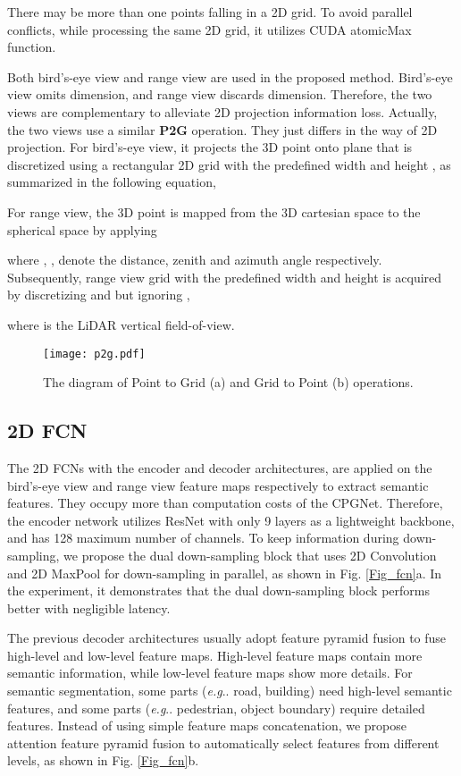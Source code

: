 \documentclass[letterpaper, 10 pt, conference]{ieeeconf}
\makeatletter
\DeclareRobustCommand\onedot{\futurelet\@let@token\@onedot}
\def\@onedot{\ifx\@let@token.\else.\null\fi\xspace}
\def\eg{\emph{e.g}\onedot} \def\Eg{\emph{E.g}\onedot}
\makeatother
\begin{document}
There may be more than one points falling in a 2D grid. To avoid parallel conflicts, while processing the same 2D grid, it utilizes CUDA atomicMax function.

Both bird’s-eye view and range view are used in the proposed method. Bird’s-eye view omits  dimension, and range view discards  dimension. Therefore, the two views are complementary to alleviate 2D projection information loss. Actually, the two views use a similar {\bf P2G} operation. They just differs in the way of 2D projection. For bird’s-eye view, it projects the 3D point onto  plane that is discretized using a rectangular 2D grid
 with the predefined width  and height , as summarized in the following equation,

For range view, the 3D point is mapped from the 3D cartesian space  to the spherical space  by applying

where , ,  denote the distance, zenith and azimuth angle respectively. Subsequently, range view grid with the predefined width  and height  is acquired by discretizing  and  but ignoring ,

where  is the LiDAR vertical field-of-view.


\begin{figure}[t]
\centering
\texttt{[image: p2g.pdf]}
\caption{The diagram of Point to Grid (a) and Grid to Point (b) operations.}
\label{Fig_p2g}
\end{figure}


\subsection{2D FCN}
The 2D FCNs with the encoder and decoder architectures, are applied on the bird’s-eye view and range view feature maps respectively to extract semantic features. They occupy more than  computation costs of the CPGNet. Therefore, the encoder network utilizes ResNet \cite{he2016deep} with only 9 layers as a lightweight backbone, and has 128 maximum number of channels. To keep information during down-sampling, we propose the dual down-sampling block that uses 2D Convolution and 2D MaxPool for down-sampling in parallel, as shown in Fig. \ref{Fig_fcn}a. In the experiment, it demonstrates that the dual down-sampling block performs better with negligible latency.

The previous decoder architectures \cite{chen2018encoder, cortinhal2020salsanext} usually adopt feature pyramid fusion to fuse high-level and low-level feature maps. High-level feature maps contain more semantic information, while low-level feature maps show more details. For semantic segmentation, some parts (\eg road, building) need high-level semantic features, and some parts (\eg pedestrian, object boundary) require detailed features. Instead of using simple feature maps concatenation, we propose attention feature pyramid fusion to automatically select features from different levels, as shown in Fig. \ref{Fig_fcn}b.
\end{document}
